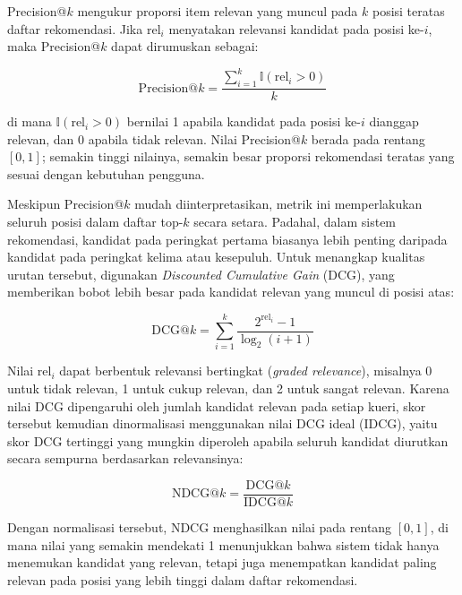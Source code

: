 Precision@$k$ mengukur proporsi item relevan yang muncul pada $k$ posisi teratas daftar rekomendasi. Jika $\mathrm{rel}_i$ menyatakan relevansi kandidat pada posisi ke-$i$, maka Precision@$k$ dapat dirumuskan sebagai:

\begin{equation}
  \mathrm{Precision@}k = \frac{\sum_{i=1}^{k} \mathbb{I}(\mathrm{rel}_i > 0)}{k}
  \label{eq:precision-k}
\end{equation}

\noindent di mana $\mathbb{I}(\mathrm{rel}_i > 0)$ bernilai 1 apabila kandidat pada posisi ke-$i$ dianggap relevan, dan 0 apabila tidak relevan. Nilai Precision@$k$ berada pada rentang $[0, 1]$; semakin tinggi nilainya, semakin besar proporsi rekomendasi teratas yang sesuai dengan kebutuhan pengguna.

Meskipun Precision@$k$ mudah diinterpretasikan, metrik ini memperlakukan seluruh posisi dalam daftar top-$k$ secara setara. Padahal, dalam sistem rekomendasi, kandidat pada peringkat pertama biasanya lebih penting daripada kandidat pada peringkat kelima atau kesepuluh. Untuk menangkap kualitas urutan tersebut, digunakan \emph{Discounted Cumulative Gain} (DCG), yang memberikan bobot lebih besar pada kandidat relevan yang muncul di posisi atas:

\begin{equation}
  \mathrm{DCG@}k = \sum_{i=1}^{k} \frac{2^{\mathrm{rel}_i} - 1}{\log_2(i + 1)}
  \label{eq:dcg-k}
\end{equation}

\noindent Nilai $\mathrm{rel}_i$ dapat berbentuk relevansi bertingkat (\emph{graded relevance}), misalnya 0 untuk tidak relevan, 1 untuk cukup relevan, dan 2 untuk sangat relevan. Karena nilai DCG dipengaruhi oleh jumlah kandidat relevan pada setiap kueri, skor tersebut kemudian dinormalisasi menggunakan nilai DCG ideal (IDCG), yaitu skor DCG tertinggi yang mungkin diperoleh apabila seluruh kandidat diurutkan secara sempurna berdasarkan relevansinya:

\begin{equation}
  \mathrm{NDCG@}k = \frac{\mathrm{DCG@}k}{\mathrm{IDCG@}k}
  \label{eq:ndcg-k}
\end{equation}

\noindent Dengan normalisasi tersebut, NDCG menghasilkan nilai pada rentang $[0, 1]$, di mana nilai yang semakin mendekati 1 menunjukkan bahwa sistem tidak hanya menemukan kandidat yang relevan, tetapi juga menempatkan kandidat paling relevan pada posisi yang lebih tinggi dalam daftar rekomendasi.

